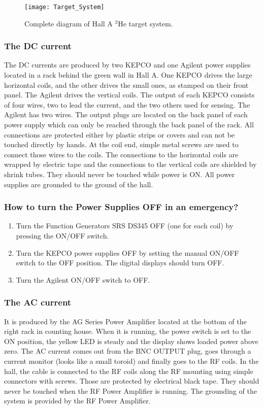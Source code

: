 {\begin{figure}
  \begin{center}
    \texttt{[image: Target\_System]}
    \caption{Complete diagram of Hall A $^3$He target system.}
    \label{fig:NMR_setup}
  \end{center}
\end{figure}

\subsubsection{The DC current}
The DC currents are produced by two KEPCO and one Agilent power
supplies located in a rack behind the green wall in Hall A. 
One KEPCO drives the large horizontal coils, and the other
drives the small ones, as stamped on their front panel.
The Agilent drives the vertical coils. The output of each KEPCO
consists of four wires, two to lead the current, and the two others 
used for sensing. The Agilent has two wires.
The output plugs are located on the back panel of each power supply 
which can only be reached through the back panel of the rack. 
All connections are protected either by plastic strips or covers and 
can not be touched directly by hands.
At the coil end, simple metal screws are used to connect those wires 
to the coils. The connections to the horizontal coils are wrapped by
electric tape and the connections to the vertical coils are shielded
by shrink tubes. They should never be touched while power is ON.
All power supplies are grounded to the ground of the hall.

\subsubsection{How to turn the Power Supplies OFF in an emergency?}
\begin{enumerate}
\item Turn the Function Generators SRS DS345 OFF (one for each coil) 
  by pressing the ON/OFF switch.
\item Turn the KEPCO power supplies OFF by setting the manual ON/OFF 
  switch to the OFF position. The digital displays should turn OFF.
\item Turn the Agilent ON/OFF switch to OFF.
\end{enumerate}

\subsubsection{The AC current}
It is produced by the AG Series Power Amplifier located at the bottom 
of the right rack in counting house. 
When it is running, the power switch is set to the
ON position, the yellow LED is steady and the display shows loaded
power above zero. 
The AC current comes out from the BNC OUTPUT plug, goes through a 
current monitor (looks like a small toroid) and finally goes to the 
RF coils. 
In the hall, the cable is connected to the RF coils along the RF
mounting using simple connectors with screws. 
Those are protected by electrical black tape. 
They should never be touched when the RF Power Amplifier is running. 
The grounding of the system is provided by the RF Power Amplifier.

}
